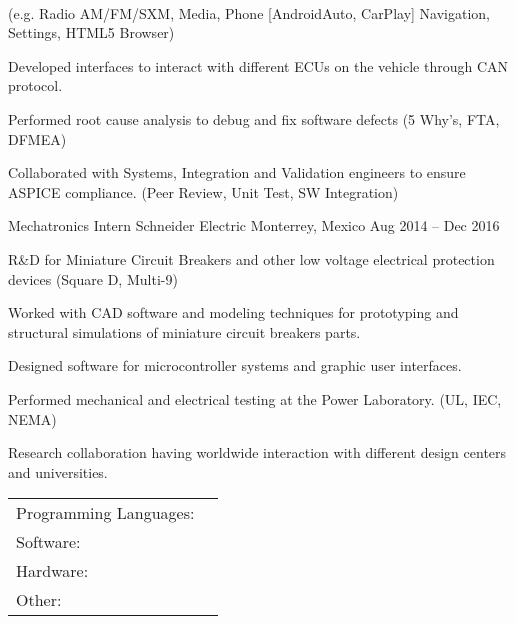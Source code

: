 \documentclass[]{awesome-cv}
\begin{document}
\begin{cventries}
{\begin{cvitems}
{			\\ (e.g. Radio AM/FM/SXM, Media, Phone [AndroidAuto, CarPlay] Navigation, Settings, HTML5 Browser)}
		\item {Developed interfaces to interact with different ECUs on the vehicle through CAN protocol.}
		\item {Performed root cause analysis to debug and fix software defects (5 Why’s, FTA, DFMEA)}
		\item {Collaborated with Systems, Integration and Validation engineers to ensure ASPICE compliance. (Peer Review, Unit Test,
		SW Integration)}
		\end{cvitems}}
	\cventry
	{Mechatronics Intern}
	{Schneider Electric}
	{Monterrey, Mexico}
	{Aug 2014 – Dec 2016}
	{\begin{cvitems}
		\item {R\&D for Miniature Circuit Breakers and other low voltage electrical protection devices (Square D, Multi-9)}
		\item {Worked with CAD software and modeling techniques for prototyping and structural simulations of miniature circuit
		breakers parts.}
		\item {Designed software for microcontroller systems and graphic user interfaces.}
		\item {Performed mechanical and electrical testing at the Power Laboratory. (UL, IEC, NEMA)}
		\item {Research collaboration having worldwide interaction with different design centers and universities.}
		\end{cvitems}}
\end{cventries}

\vspace{-5mm}
\begin{cventries}
	\cventry
	{}
	{\def\arraystretch{1.15}{\begin{tabular}{ l l }
		Programming Languages:  & {\skill{\quad C/C++, Python, Java}} \\
		Software:  & {\skill{\quad Linux, QNX, Android, Git, Qt, OpenCV, ROS}} \\
		Hardware:  & {\skill{\quad x86, ARM Cortex-A, Raspberry Pi, Arduino, NVIDIA Jetson}} \\
		Other:  & {\skill{\quad CAN, Ethernet, WiFi, BLE, UWB, MQTT, Protobuf}} \\
		\end{tabular}}}
	{}
	{}
	{}
\end{cventries}
\end{document}
